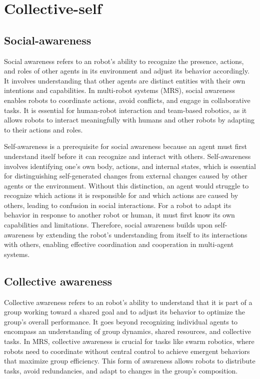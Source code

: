 \chapter{Collective-self}

\section{Social-awareness}
    Social awareness refers to an robot's ability to recognize the presence, actions, and roles of other agents in its environment and adjust its behavior accordingly. It involves understanding that other agents are distinct entities with their own intentions and capabilities. In multi-robot systems (MRS), social awareness enables robots to coordinate actions, avoid conflicts, and engage in collaborative tasks. It is essential for human-robot interaction and team-based robotics, as it allows robots to interact meaningfully with humans and other robots by adapting to their actions and roles. \cite{fong-2003-socially-interactive-robots-survey}

    Self-awareness is a prerequisite for social awareness because an agent must first understand itself before it can recognize and interact with others. Self-awareness involves identifying one’s own body, actions, and internal states, which is essential for distinguishing self-generated changes from external changes caused by other agents or the environment. Without this distinction, an agent would struggle to recognize which actions it is responsible for and which actions are caused by others, leading to confusion in social interactions. For a robot to adapt its behavior in response to another robot or human, it must first know its own capabilities and limitations. Therefore, social awareness builds upon self-awareness by extending the robot’s understanding from itself to its interactions with others, enabling effective coordination and cooperation in multi-agent systems.
    \cite{groom-2007-self-awareness-in-human-robot-interaction}
\section{Collective awareness}
    Collective awareness refers to an robot's ability to understand that it is part of a group working toward a shared goal and to adjust its behavior to optimize the group's overall performance. It goes beyond recognizing individual agents to encompass an understanding of group dynamics, shared resources, and collective tasks. In MRS, collective awareness is crucial for tasks like swarm robotics, where robots need to coordinate without central control to achieve emergent behaviors that maximize group efficiency. This form of awareness allows robots to distribute tasks, avoid redundancies, and adapt to changes in the group’s composition. \cite{brambilla-2013-swarm-robotics-review}
    
